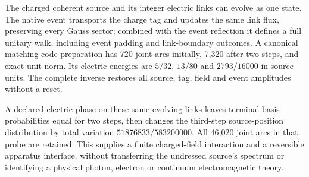 The charged coherent source and its integer electric links can evolve as
one state. The native event transports the charge tag and updates the same
link flux, preserving every Gauss sector; combined with the event reflection
it defines a full unitary walk, including event padding and link-boundary
outcomes. A canonical matching-code preparation has 720 joint arcs initially,
7,320 after two steps, and exact unit norm. Its electric energies are
$5/32$, $13/80$ and $2793/16000$ in source units. The complete inverse restores
all source, tag, field and event amplitudes without a reset.

A declared electric phase on these same evolving links leaves terminal
basis probabilities equal for two steps, then changes the third-step
source-position distribution by total variation $51876833/583200000$.
All 46,020 joint arcs in that probe are retained. This supplies a finite
charged-field interaction and a reversible apparatus interface, without
transferring the undressed source's spectrum or identifying a physical
photon, electron or continuum electromagnetic theory.
